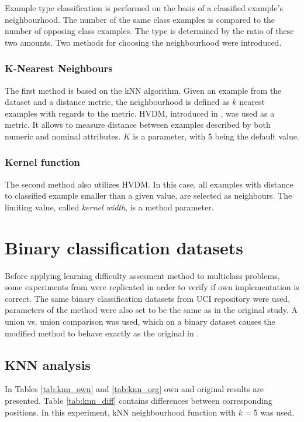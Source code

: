 \documentclass[12pt]{article}
\begin{document}
Example type classification is performed on the basis of a classified example's neighbourhood. The number of the same class examples is compared to the number of opposing class examples. The type is determined by the ratio of these two amounts. Two methods for choosing the neighbourhood were introduced.

\subsubsection{K-Nearest Neighbours}

The first method is based on the kNN algorithm. Given an example from the dataset and a distance metric, the neighbourhood is defined as $k$ nearest examples with regards to the metric. HVDM, introduced in \cite{Wilson1997}, was used as a metric. It allows to measure distance between examples described by both numeric and nominal attributes. $K$ is a parameter, with $5$ being the default value.

\subsubsection{Kernel function}

The second method also utilizes HVDM. In this case, all examples with distance to classified example smaller than a given value, are selected as neighbours. The limiting value, called \textit{kernel width}, is a method parameter.

\section{Binary classification datasets}

Before applying learning difficulty assesment method to multiclass problems, some experiments from \cite{Napierala2016} were replicated in order to verify if own implementation is correct. The same binary classification datasets from UCI repository were used, parameters of the method were also set to be the same as in the original study. A union vs. union comparison was used, which on a binary dataset causes the modified method to behave exactly as the original in \cite{Napierala2016}.

\subsection{KNN analysis}

In Tables \ref{tab:knn_own} and \ref{tab:knn_org} own and original results are presented. Table \ref{tab:knn_diff} contains differences between corresponding positions. In this experiment, kNN neighbourhood function with $k=5$ was used.
\end{document}
